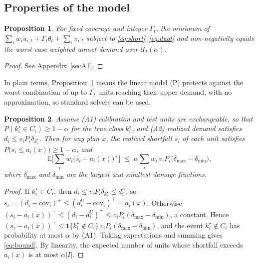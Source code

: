 \documentclass[pdflatex,sn-basic]{sn-jnl}
\theoremstyle{plain}%
\newtheorem{proposition}{Proposition}%
\theoremstyle{remark}%
\theoremstyle{definition}%
\begin{document}
\subsection{Properties of the model}

\begin{proposition}\label{prop:exact}
For fixed coverage and integer $\Gamma_t$, the minimum of $\sum_i w_i u_{i,t} + \Gamma_t\theta_t + \sum_i \pi_{i,t}$ subject to \eqref{eq:short}--\eqref{eq:dual} and non-negativity equals the worst-case weighted unmet demand over $\mathcal{U}_t(\alpha)$.
\end{proposition}

\begin{proof}
See Appendix~\ref{secA1}.
\end{proof}

In plain terms, Proposition~\ref{prop:exact} means the linear model (P) protects against the worst combination of up to $\Gamma_t$ units reaching their upper demand, with no approximation, so standard solvers can be used.

\begin{proposition}\label{prop:bound}
Assume (A1) calibration and test units are exchangeable, so that $P(k^{\star}_i \in C_i) \ge 1-\alpha$ for the true class $k^{\star}_i$, and (A2) realized demand satisfies $d_i \le v_i P_i \delta_{k^{\star}_i}$. Then for any plan $x$, the realized shortfall $s_i$ of each unit satisfies $P\big(s_i \le a_i(x)\big) \ge 1-\alpha$, and
\begin{equation}
\mathbb{E}\Big[\sum_{i} w_i \big(s_i - a_i(x)\big)^{+}\Big] \;\le\; \alpha \sum_{i} w_i\, v_i P_i \big(\delta_{\max} - \delta_{\min}\big),
\label{eq:bound}
\end{equation}
where $\delta_{\max}$ and $\delta_{\min}$ are the largest and smallest damage fractions.
\end{proposition}

\begin{proof}
If $k^{\star}_i \in C_i$, then $d_i \le v_i P_i \delta_{k^\star_i} \le d^U_i$, so $s_i = (d_i - \mathrm{cov}_i)^+ \le (d^U_i - \mathrm{cov}_i)^+ = a_i(x)$. Otherwise $(s_i - a_i(x))^+ \le (d_i - d^U_i)^+ \le v_i P_i(\delta_{\max} - \delta_{\min})$, a constant. Hence $(s_i - a_i(x))^+ \le \mathbf{1}\{k^{\star}_i \notin C_i\}\, v_i P_i(\delta_{\max} - \delta_{\min})$, and the event $k^{\star}_i \notin C_i$ has probability at most $\alpha$ by (A1). Taking expectations and summing gives \eqref{eq:bound}. By linearity, the expected number of units whose shortfall exceeds $a_i(x)$ is at most $\alpha |I|$.
\end{proof}
\end{document}
